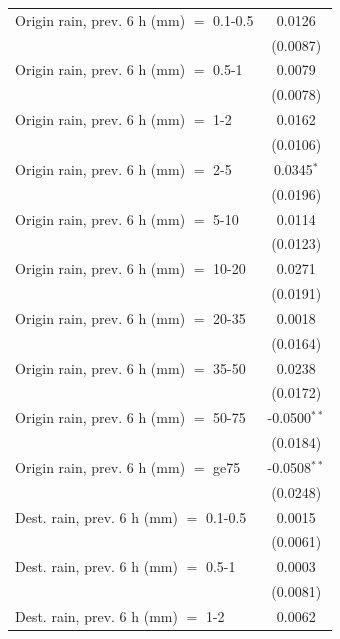 \begin{tabular}{lc}
   Origin rain, prev. 6 h (mm) $=$ 0.1-0.5       & 0.0126\\   
                                                 & (0.0087)\\   
   Origin rain, prev. 6 h (mm) $=$ 0.5-1         & 0.0079\\   
                                                 & (0.0078)\\   
   Origin rain, prev. 6 h (mm) $=$ 1-2           & 0.0162\\   
                                                 & (0.0106)\\   
   Origin rain, prev. 6 h (mm) $=$ 2-5           & 0.0345$^{*}$\\   
                                                 & (0.0196)\\   
   Origin rain, prev. 6 h (mm) $=$ 5-10          & 0.0114\\   
                                                 & (0.0123)\\   
   Origin rain, prev. 6 h (mm) $=$ 10-20         & 0.0271\\   
                                                 & (0.0191)\\   
   Origin rain, prev. 6 h (mm) $=$ 20-35         & 0.0018\\   
                                                 & (0.0164)\\   
   Origin rain, prev. 6 h (mm) $=$ 35-50         & 0.0238\\   
                                                 & (0.0172)\\   
   Origin rain, prev. 6 h (mm) $=$ 50-75         & -0.0500$^{**}$\\   
                                                 & (0.0184)\\   
   Origin rain, prev. 6 h (mm) $=$ ge75          & -0.0508$^{**}$\\   
                                                 & (0.0248)\\   
   Dest. rain, prev. 6 h (mm) $=$ 0.1-0.5        & 0.0015\\   
                                                 & (0.0061)\\   
   Dest. rain, prev. 6 h (mm) $=$ 0.5-1          & 0.0003\\   
                                                 & (0.0081)\\   
   Dest. rain, prev. 6 h (mm) $=$ 1-2            & 0.0062\\   

\end{tabular}
